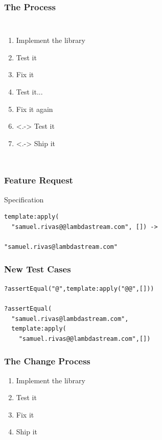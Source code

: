 \documentclass[xcolor=dvipsnames]{beamer}
\begin{document}
\begin{frame}
  \frametitle{The Process}
  \begin{center}
    \begin{columns}
      \begin{enumerate}
      \item Implement the library
      \item Test it
      \item Fix it
      \item<+-> Test it...
      \item<+-> Fix it again
      \item<.-> Test it
      \item<.-> Ship it
      \end{enumerate}
      \onslide<+->{%
        {\huge \textbf{\euro\euro\euro} !!}
      }
    \end{columns}
  \end{center}
\end{frame}

\begin{frame}[fragile]
  \frametitle{Feature Request}

  \begin{block}{Specification}%
\begin{verbatim}
template:apply(
  "samuel.rivas@@lambdastream.com", []) ->

"samuel.rivas@lambdastream.com"
\end{verbatim}
  \end{block}
\end{frame}

\begin{frame}[fragile]
  \frametitle{New Test Cases}

\begin{verbatim}
?assertEqual("@",template:apply("@@",[]))

?assertEqual(
  "samuel.rivas@lambdastream.com",
  template:apply(
    "samuel.rivas@@lambdastream.com",[])
\end{verbatim}
\end{frame}

\begin{frame}
  \frametitle{The Change Process}
  \begin{enumerate}
  \item Implement the library
  \item Test it
  \item Fix it
  \item Ship it
  \end{enumerate}
\end{frame}
\end{document}
